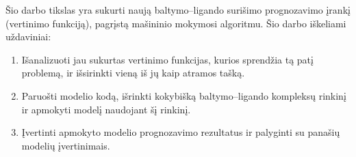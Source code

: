 Šio darbo tikslas yra sukurti naują baltymo--ligando surišimo prognozavimo įrankį (vertinimo funkciją), pagrįstą mašininio mokymosi algoritmu. Šio darbo iškeliami uždaviniai:
\begin{enumerate}
\item Išanalizuoti jau sukurtas vertinimo funkcijas, kurios sprendžia tą patį problemą, ir išsirinkti vieną iš jų kaip atramos tašką.
\item Paruošti modelio kodą, išrinkti kokybišką baltymo--ligando kompleksų rinkinį ir apmokyti modelį naudojant šį rinkinį.
\item Įvertinti apmokyto modelio prognozavimo rezultatus ir palyginti su panašių modelių įvertinimais.
\end{enumerate}










